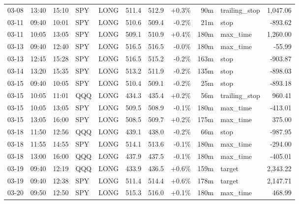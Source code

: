 \documentclass[11pt,a4paper,twoside]{article}
\begin{document}
\begin{center}
\begin{longtable}{>{\color{txtmain}}l l l l l r r r r >{\color{txtmain}}l r}
03-08 & 13:40 & 15:10 & SPY & LONG & 511.4 & 512.9 & \textcolor{wingreen}{+0.3\%} & 90m & trailing\_stop & \textcolor{wingreen}{1,047.06} \\
03-11 & 09:40 & 10:01 & SPY & LONG & 510.6 & 509.4 & \textcolor{lossred}{-0.2\%} & 21m & stop & \textcolor{lossred}{-893.62} \\
03-11 & 10:05 & 13:05 & SPY & LONG & 509.1 & 510.9 & \textcolor{wingreen}{+0.4\%} & 180m & max\_time & \textcolor{wingreen}{1,260.00} \\
03-13 & 09:40 & 12:40 & SPY & LONG & 516.5 & 516.5 & \textcolor{lossred}{-0.0\%} & 180m & max\_time & \textcolor{lossred}{-55.99} \\
03-13 & 12:45 & 15:28 & SPY & LONG & 516.5 & 515.2 & \textcolor{lossred}{-0.2\%} & 163m & stop & \textcolor{lossred}{-903.87} \\
03-14 & 13:20 & 15:35 & SPY & LONG & 513.2 & 511.9 & \textcolor{lossred}{-0.2\%} & 135m & stop & \textcolor{lossred}{-898.03} \\
03-15 & 09:40 & 10:05 & SPY & LONG & 510.4 & 509.1 & \textcolor{lossred}{-0.2\%} & 25m & stop & \textcolor{lossred}{-893.18} \\
03-15 & 10:05 & 11:01 & QQQ & LONG & 434.3 & 435.4 & \textcolor{wingreen}{+0.2\%} & 56m & trailing\_stop & \textcolor{wingreen}{960.41} \\
03-15 & 10:05 & 13:05 & SPY & LONG & 509.5 & 508.9 & \textcolor{lossred}{-0.1\%} & 180m & max\_time & \textcolor{lossred}{-413.01} \\
03-15 & 13:05 & 16:00 & SPY & LONG & 508.5 & 509.7 & \textcolor{wingreen}{+0.2\%} & 175m & max\_time & \textcolor{wingreen}{375.00} \\
03-18 & 11:50 & 12:56 & QQQ & LONG & 439.1 & 438.0 & \textcolor{lossred}{-0.2\%} & 66m & stop & \textcolor{lossred}{-987.95} \\
03-18 & 11:55 & 14:55 & SPY & LONG & 514.1 & 513.6 & \textcolor{lossred}{-0.1\%} & 180m & max\_time & \textcolor{lossred}{-294.00} \\
03-18 & 13:00 & 16:00 & QQQ & LONG & 437.9 & 437.5 & \textcolor{lossred}{-0.1\%} & 180m & max\_time & \textcolor{lossred}{-405.01} \\
03-19 & 09:40 & 12:19 & QQQ & LONG & 433.9 & 436.5 & \textcolor{wingreen}{+0.6\%} & 159m & target & \textcolor{wingreen}{2,343.22} \\
03-19 & 09:40 & 12:38 & SPY & LONG & 511.4 & 514.4 & \textcolor{wingreen}{+0.6\%} & 178m & target & \textcolor{wingreen}{2,147.71} \\
03-20 & 09:50 & 12:50 & SPY & LONG & 515.3 & 516.0 & \textcolor{wingreen}{+0.1\%} & 180m & max\_time & \textcolor{wingreen}{468.99} \\

\end{longtable}
\end{center}
\end{document}
